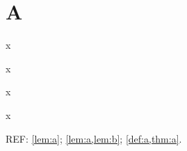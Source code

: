 \documentclass{article}
\begin{document}
\section{A}
\begin{definition}\label{def:a}x\end{definition}
\begin{lemma}\label{lem:a}x\end{lemma}
\begin{lemma}\label{lem:b}x\end{lemma}
\begin{theorem}\label{thm:a}x\end{theorem}
REF: \cref{lem:a}; \cref{lem:a,lem:b}; \cref{def:a,thm:a}.
\end{document}
